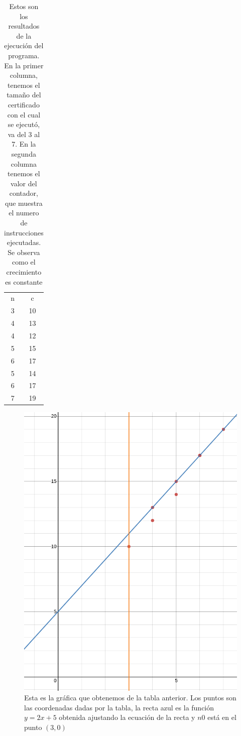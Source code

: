 \documentclass{article}
\begin{document}
    \begin{table}[h!]
    \begin{tabular}{| c | c |}
            \hline
            n  & c   \\
    3 & 10 \\
    4 & 13 \\
    4 & 12 \\
    5 & 15 \\
    6 & 17 \\
    5 & 14 \\
    6 & 17 \\
    7 & 19\\
        \hline
    \end{tabular}
    \caption{Estos son los resultados de la ejecución del programa. En la primer columna, tenemos el tamaño del certificado con el cual se ejecutó, va del 3 al 7. En la segunda columna tenemos el valor del contador, que muestra el numero de instrucciones ejecutadas. Se observa como el crecimiento es constante}
    \end{table}
     \begin{figure}[h!]
            \centering
            \includegraphics[width=0.4\textheight]{hamilton_graph.png}
            \caption{Esta es la gráfica que obtenemos de la tabla anterior. Los puntos son las coordenadas dadas por la tabla, la recta azul es la función $y=2x+5$ obtenida ajustando la ecuación de la recta y $n0$ está en el punto $(3,0)$}
            \label{fig:my_label}
        \end{figure}
    
\end{document}

